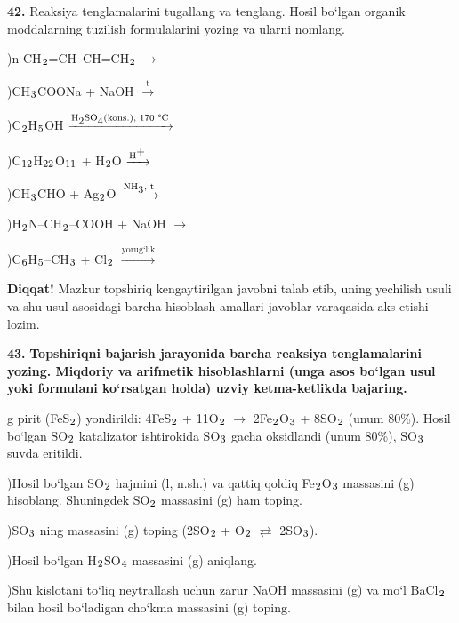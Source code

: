 \documentclass[11pt,a4paper]{article}
\renewcommand{\textsubscript}[1]{\ensuremath{_{\text{\fontsize{8}{8}\selectfont #1}}}}
\renewcommand{\textsuperscript}[1]{\ensuremath{^{\text{\fontsize{8}{8}\selectfont #1}}}}
\newcommand{\diqqat}[1]{\par\smallskip\noindent\textbf{Diqqat!} #1\par\medskip}
\begin{document}
\noindent\textbf{42.} Reaksiya tenglamalarini tugallang va tenglang. Hosil bo`lgan organik moddalarning tuzilish formulalarini yozing va ularni nomlang.\par
{})n CH\textsubscript{2}=CH--CH=CH\textsubscript{2} $\to$\par
{})CH\textsubscript{3}COONa + NaOH $\xrightarrow{\text{t}}$\par
{})C\textsubscript{2}H\textsubscript{5}OH $\xrightarrow{\text{H\textsubscript{2}SO\textsubscript{4}(kons.), 170 \textdegree{}C}}$\par
{})C\textsubscript{12}H\textsubscript{22}O\textsubscript{11} + H\textsubscript{2}O $\xrightarrow{\text{H\textsuperscript{+}}}$\par
{})CH\textsubscript{3}CHO + Ag\textsubscript{2}O $\xrightarrow{\text{NH\textsubscript{3}, t}}$\par
{})H\textsubscript{2}N--CH\textsubscript{2}--COOH + NaOH $\to$\par
{})C\textsubscript{6}H\textsubscript{5}--CH\textsubscript{3} + Cl\textsubscript{2} $\xrightarrow{\text{yorug`lik}}$\par
\diqqat{Mazkur topshiriq kengaytirilgan javobni talab etib, uning yechilish usuli va shu usul asosidagi barcha hisoblash amallari javoblar varaqasida aks etishi lozim.}
\noindent\textbf{43.} \textbf{Topshiriqni bajarish jarayonida barcha reaksiya tenglamalarini yozing. Miqdoriy va arifmetik hisoblashlarni (unga asos bo`lgan usul yoki formulani ko`rsatgan holda) uzviy ketma-ketlikda bajaring.}\par{} g pirit (FeS\textsubscript{2}) yondirildi: 4FeS\textsubscript{2} + 11O\textsubscript{2} $\to$ 2Fe\textsubscript{2}O\textsubscript{3} + 8SO\textsubscript{2} (unum 80\%). Hosil bo`lgan SO\textsubscript{2} katalizator ishtirokida SO\textsubscript{3} gacha oksidlandi (unum 80\%), SO\textsubscript{3} suvda eritildi.\par
{})Hosil bo`lgan SO\textsubscript{2} hajmini (l, n.sh.) va qattiq qoldiq Fe\textsubscript{2}O\textsubscript{3} massasini (g) hisoblang. Shuningdek SO\textsubscript{2} massasini (g) ham toping.\par
{})SO\textsubscript{3} ning massasini (g) toping (2SO\textsubscript{2} + O\textsubscript{2} $\rightleftarrows$ 2SO\textsubscript{3}).\par
{})Hosil bo`lgan H\textsubscript{2}SO\textsubscript{4} massasini (g) aniqlang.\par
{})Shu kislotani to`liq neytrallash uchun zarur NaOH massasini (g) va mo`l BaCl\textsubscript{2} bilan hosil bo`ladigan cho`kma massasini (g) toping.\par
\end{document}
